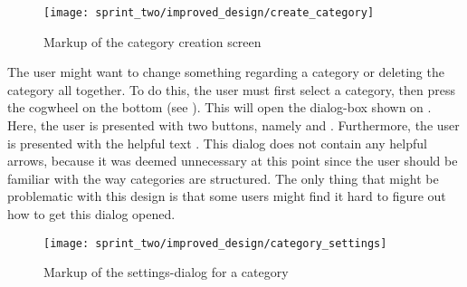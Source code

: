 \begin{figure}[!htbp]
    \centering
    \texttt{[image: sprint\_two/improved\_design/create\_category]}
    \caption{Markup of the category creation screen}
    \label{fig:improved_design_create_category}
\end{figure}

The user might want to change something regarding a category or deleting the category all together. To do this, the user must first select a category, then press the cogwheel on the bottom (see ). This will open the dialog-box shown on . Here, the user is presented with two buttons, namely  and . Furthermore, the user is presented with the helpful text . This dialog does not contain any helpful arrows, because it was deemed unnecessary at this point since the user should be familiar with the way categories are structured. The only thing that might be problematic with this design is that some users might find it hard to figure out how to get this dialog opened. 

\begin{figure}[!htbp]
    \centering
    \texttt{[image: sprint\_two/improved\_design/category\_settings]}
    \caption{Markup of the settings-dialog for a category}
    \label{fig:improved_design_category_settings}
\end{figure}

\FloatBarrier